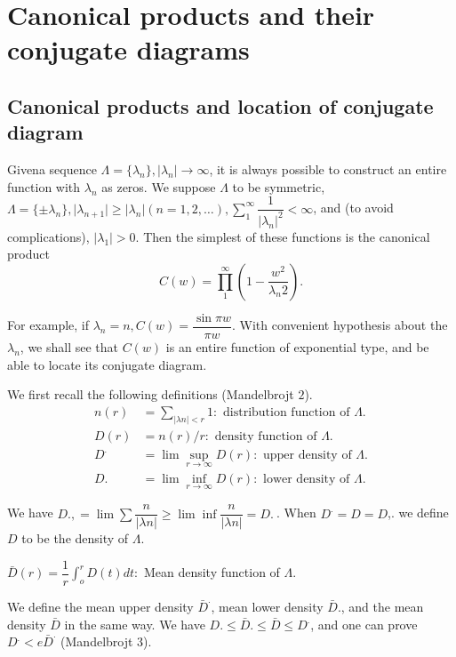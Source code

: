 \chapter{Canonical products and their conjugate diagrams}\label{chap10}%

\section{Canonical products and location of conjugate
  diagram}\label{chap10:sec1} %

Given\pageoriginale a sequence $\Lambda = \{\lambda_n\}, \big|\lambda_n \big| \to
\infty$, it is always possible to construct an entire function with
$\lambda_n$ as zeros. We suppose $\Lambda$ to be symmetric, $\Lambda =
\{\pm \lambda_n\}, \big|\lambda_{n + 1} \big| \ge \big| \lambda_n
\big| (n = 1,2, \ldots ), \sum\limits^{\infty}_{1}
\dfrac{1}{|\lambda_n|^2} < \infty$, and (to avoid complications),
$|\lambda_1| > 0$. Then the simplest of these functions is the
canonical product 
$$
C(w) = \prod^\infty_1 \left(1 - \frac{w^2} {\lambda_n 2}\right).
$$

For example, if $\lambda_n = n, C(w) = \dfrac{\sin \pi w}{\pi
 w}$. With convenient hypothesis about the $\lambda_n$, we shall see
that $C(w)$ is an entire function of exponential type, and be able to
locate its conjugate diagram. 

We first recall the following definitions (Mandelbrojt $2$).
\begin{align*}
 n(r) & = \sum_{|\lambda n | < r} 1 : \text { distribution function
  of } \Lambda.\\ 
 D(r) & = n (r) / r : \text { density function of } \Lambda.\\
 D^. &= \lim \sup\limits_{r \to \infty} D(r) : \text{ upper density
  of } \Lambda.\\ 
 D. &= \lim \inf_{r \to \infty} D(r) : \text{ lower density of } \Lambda.
\end{align*}

We have $D., = \lim \sum \dfrac{n}{|\lambda n|} \ge \lim \inf
\dfrac{n}{|\lambda n|} = D. ~ $. When $D^. = D = D$,. we define 
$D$ to be the density of $\Lambda$. 

$\bar{D}(r) = \dfrac{1}{r} \int^r_o D(t) dt :$ Mean density function
of $\Lambda$. 

We define the mean upper density $\bar{D}^{.}$, mean lower density
$\bar{D}$., and the mean density $\bar{D}$ in the same way. We have
$D. \le \bar{D}. \le \bar{D} \le D^{.}$, and one can prove $D^. < e
\bar{D}^{.}$ (Mandelbrojt $3$). 

